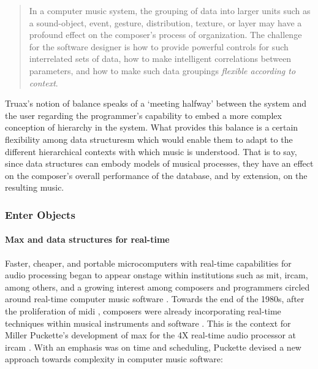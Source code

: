 	\begin{quote}
		In a computer music system, the grouping of data into larger units such as a sound-object, event, gesture, distribution, texture, or layer may have a profound effect on the composer's process of organization. The challenge for the software designer is how to provide powerful controls for such interrelated sets of data, how to make intelligent correlations between parameters, and how to make such data groupings \textit{flexible according to context}. \im \parencite[157]{Emm86:The}
	\end{quote}

	Truax's notion of balance speaks of a `meeting halfway' between the system and the user regarding the programmer's capability to embed a more complex conception of hierarchy in the system. What provides this balance is a certain flexibility among data structuresm which would enable them to adapt to the different hierarchical contexts with which music is understood. That is to say, since data structures can embody models of musical processes, they have an effect on the composer's overall performance of the database, and by extension, on the resulting music. 

\subsubsection{Enter Objects}


	\paragraph{Max and data structures for real-time}
	\label{computer:real-time}

	Faster, cheaper, and portable microcomputers with real-time capabilities for audio processing began to appear onstage within institutions such as \gls{mit}, \gls{ircam}, among others, and a growing interest among composers and programmers circled around real-time computer music software . Towards the end of the 1980s, after the proliferation of \gls{midi} \parencite{Loy85:Mus}, composers were already incorporating real-time techniques within musical instruments and software \parencite{Puc91:Som}. This is the context for Miller Puckette's development of \gls{max} for the 4X real-time audio processor at \gls{ircam} \parencite{DBLP:conf/icmc/Puckette86}. With an emphasis was on time and scheduling, Puckette devised a new approach towards complexity in computer music software:

